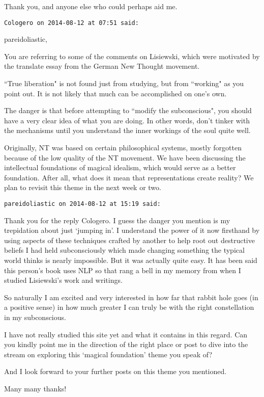 \begin{footnotesize}
\begin{sffamily}
Thank you, and anyone else who could perhaps aid me.


\hfill

\texttt{Cologero on 2014-08-12 at 07:51 said: }

pareidoliastic,

You are referring to some of the comments on Lisiewski, which were motivated by the translate essay from the German New Thought movement.

``True liberation" is not found just from studying, but from ``working" as you point out. It is not likely that much can be accomplished on one's own.

The danger is that before attempting to ``modify the subconscious", you should have a very clear idea of what you are doing. In other words, don't tinker with the mechanisms until you understand the inner workings of the soul quite well.

Originally, NT was based on certain philosophical systems, mostly forgotten because of the low quality of the NT movement. We have been discussing the intellectual foundations of magical idealism, which would serve as a better foundation. After all, what does it mean that representations create reality? We plan to revisit this theme in the next week or two.


\hfill

\texttt{pareidoliastic on 2014-08-12 at 15:19 said: }

Thank you for the reply Cologero. I guess the danger you mention is my trepidation about just `jumping in'. I understand the power of it now firsthand by using aspects of these techniques crafted by another to help root out destructive beliefs I had held subconsciously which made changing something the typical world thinks is nearly impossible. But it was actually quite easy. It has been said this person's book uses NLP so that rang a bell in my memory from when I studied Lisiewski's work and writings.

So naturally I am excited and very interested in how far that rabbit hole goes (in a positive sense) in how much greater I can truly be with the right constellation in my subconscious.

I have not really studied this site yet and what it contains in this regard. Can you kindly point me in the direction of the right place or post to dive into the stream on exploring this `magical foundation' theme you speak of?

And I look forward to your further posts on this theme you mentioned.

Many many thanks!


\end{sffamily}\end{footnotesize}
